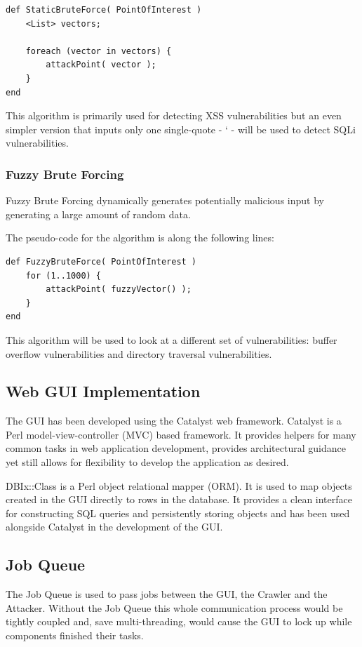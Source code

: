 \documentclass[12pt,a4paper]{article}
\begin{document}
\begin{lstlisting}
def StaticBruteForce( PointOfInterest )     
    <List> vectors;
    
    foreach (vector in vectors) { 
        attackPoint( vector );
    }
end
\end{lstlisting}

This algorithm is primarily used for detecting XSS vulnerabilities but an even simpler version that inputs only one single-quote - ‘ - will be used to detect SQLi vulnerabilities.

\subsubsection{Fuzzy Brute Forcing}
Fuzzy Brute Forcing dynamically generates potentially malicious input by generating a large amount of random data.

The pseudo-code for the algorithm is along the following lines:

\begin{lstlisting} 
def FuzzyBruteForce( PointOfInterest )
	for (1..1000) { 		
	    attackPoint( fuzzyVector() ); 	
	}
end
\end{lstlisting}
This algorithm will be used to look at a different set of vulnerabilities: buffer overflow vulnerabilities and directory traversal vulnerabilities.

\subsection{Web GUI Implementation}
The GUI has been developed using the Catalyst web framework.  Catalyst is a Perl model-view-controller (MVC) based framework.  It provides helpers for many common tasks in web application development, provides architectural guidance yet still allows for flexibility to develop the application as desired.

DBIx::Class is a Perl object relational mapper (ORM).  It is used to map objects created in the GUI directly to rows in the database.  It provides a clean interface for constructing SQL queries and persistently storing objects and has been used alongside Catalyst in the development of the GUI.

\subsection{Job Queue}
The Job Queue is used to pass jobs between the GUI, the Crawler and the Attacker.  Without the Job Queue this whole communication process would be tightly coupled and, save multi-threading, would cause the GUI to lock up while components finished their tasks.
\end{document}
